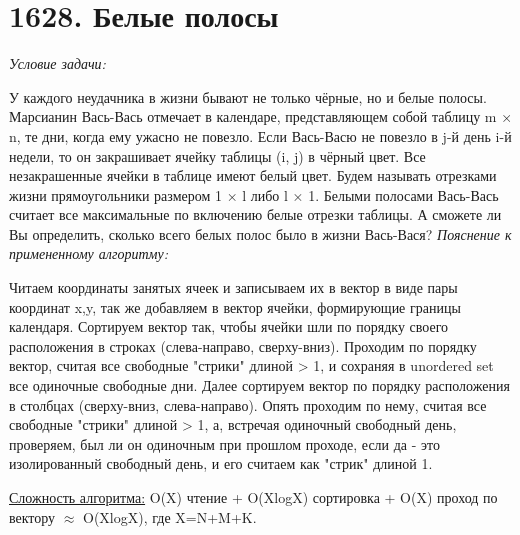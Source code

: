\section{1628. Белые полосы}
\textit{Условие задачи:} \par
У каждого неудачника в жизни бывают не только чёрные, но и белые полосы. Марсианин Вась-Вась отмечает в календаре,
представляющем собой таблицу m × n, те дни, когда ему ужасно не повезло. Если Вась-Васю не повезло в j-й день i-й недели,
то он закрашивает ячейку таблицы (i, j) в чёрный цвет. Все незакрашенные ячейки в таблице имеют белый цвет. Будем называть
отрезками жизни прямоугольники размером 1 × l либо l × 1. Белыми полосами Вась-Вась считает все максимальные по
включению белые отрезки таблицы. А сможете ли Вы определить, сколько всего белых полос было в жизни Вась-Вася?
\textit{Пояснение к примененному алгоритму:} \par
Читаем координаты занятых ячеек и записываем их в вектор в виде пары координат {x,y}, так же добавляем в вектор ячейки,
формирующие границы календаря. Сортируем вектор так, чтобы ячейки шли по порядку своего расположения в строках (слева-направо, сверху-вниз).
Проходим по порядку вектор, считая все свободные "стрики" длиной > 1, и сохраняя в unordered set все одиночные свободные дни.
Далее сортируем вектор по порядку расположения в столбцах (сверху-вниз, слева-направо). Опять проходим по нему, считая
все свободные "стрики" длиной > 1, а, встречая одиночный свободный день, проверяем, был ли он одиночным при прошлом проходе,
если да - это изолированный свободный день, и его считаем как "стрик" длиной 1.


\underline{Сложность алгоритма:} O(X) чтение + O(XlogX) сортировка + O(X) проход по вектору $\approx$ O(XlogX), где X=N+M+K.


